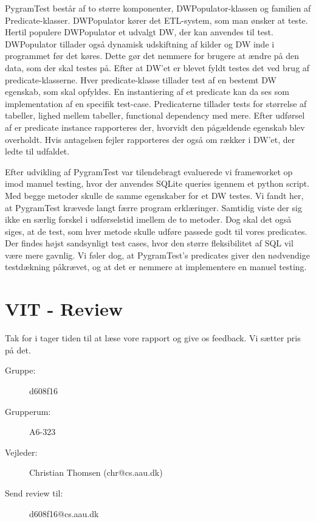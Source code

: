 PygramTest består af to større komponenter, DWPopulator-klassen og familien af Predicate-klasser. DWPopulator kører det ETL-system, som man ønsker at teste. Hertil populere DWPopulator  et udvalgt DW, der kan anvendes til test. DWPopulator tillader også dynamisk udskiftning af kilder og DW inde i programmet før det køres. Dette gør det nemmere for brugere at ændre på den data, som der skal testes på. Efter at DW’et er blevet fyldt testes det ved brug af predicate-klasserne. Hver predicate-klasse tillader test af en bestemt DW egenskab, som skal opfyldes. En instantiering af et predicate kan da ses som implementation af en specifik test-case. Predicaterne tillader tests for størrelse af tabeller, lighed mellem tabeller, functional dependency med mere. Efter udførsel af er predicate instance rapporteres der, hvorvidt den pågældende egenskab blev overholdt. Hvis antagelsen fejler rapporteres der også om rækker i DW’et, der ledte til udfaldet. 

Efter udvikling af PygramTest var tilendebragt evaluerede vi frameworket op imod manuel testing, hvor der anvendes SQLite queries igennem et python script. Med begge metoder skulle de samme egenskaber for et DW testes. Vi fandt her, at PygramTest krævede langt færre program erklæringer. Samtidig viste der sig ikke en særlig forskel i udførselstid imellem de to metoder. Dog skal det også siges, at de test, som hver metode skulle udføre passede godt til vores predicates. Der findes højst sandsynligt test cases, hvor den større fleksibilitet af SQL vil være mere gavnlig. Vi føler dog, at PygramTest’s predicates giver den nødvendige testdækning påkrævet, og at det er nemmere at implementere en manuel testing.

\section*{VIT - Review}
Tak for i tager tiden til at læse vore rapport og give os feedback. Vi sætter pris på det.
\begin{description}
\item[Gruppe:] d608f16
\item[Grupperum:] A6-323
\item[Vejleder:]Christian Thomsen (chr@cs.aau.dk)
\item[Send review til:] d608f16@cs.aau.dk
\end{description}









